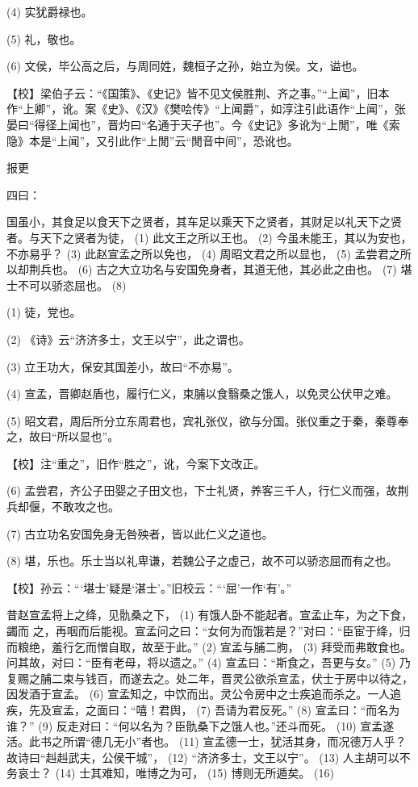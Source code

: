 \documentclass[12pt,UTF8]{ctexbook}
\begin{document}
(4) 实犹爵禄也。

(5) 礼，敬也。

(6) 文侯，毕公高之后，与周同姓，魏桓子之孙，始立为侯。文，谥也。

【校】梁伯子云：“《国策》、《史记》皆不见文侯胜荆、齐之事。”“上闻”，旧本作“上卿”，讹。案《史》、《汉》《樊哙传》“上闻爵”，如淳注引此语作“上闻”，张晏曰“得径上闻也”，晋灼曰“名通于天子也”。今《史记》多讹为“上閒”，唯《索隐》本是“上闻”，又引此作“上閒”云“閒音中间”，恐讹也。





报更


四曰：

国虽小，其食足以食天下之贤者，其车足以乘天下之贤者，其财足以礼天下之贤者。与天下之贤者为徒， (1) 此文王之所以王也。 (2) 今虽未能王，其以为安也，不亦易乎？ (3) 此赵宣孟之所以免也， (4) 周昭文君之所以显也， (5) 孟尝君之所以却荆兵也。 (6) 古之大立功名与安国免身者，其道无他，其必此之由也。 (7) 堪士不可以骄恣屈也。 (8)

(1) 徒，党也。

(2) 《诗》云“济济多士，文王以宁”，此之谓也。

(3) 立王功大，保安其国差小，故曰“不亦易”。

(4) 宣孟，晋卿赵盾也，履行仁义，束脯以食翳桑之饿人，以免灵公伏甲之难。

(5) 昭文君，周后所分立东周君也，宾礼张仪，欲与分国。张仪重之于秦，秦尊奉之，故曰“所以显也”。

【校】注“重之”，旧作“胜之”，讹，今案下文改正。

(6) 孟尝君，齐公子田婴之子田文也，下士礼贤，养客三千人，行仁义而强，故荆兵却偃，不敢攻之也。

(7) 古立功名安国免身无咎殃者，皆以此仁义之道也。

(8) 堪，乐也。乐士当以礼卑谦，若魏公子之虚己，故不可以骄恣屈而有之也。

【校】孙云：“‘堪士’疑是‘湛士’。”旧校云：“‘屈’一作‘有’。”

昔赵宣孟将上之绛，见骩桑之下， (1) 有饿人卧不能起者。宣孟止车，为之下食，蠲而 之，再咽而后能视。宣孟问之曰：“女何为而饿若是？”对曰：“臣宦于绛，归而粮绝，羞行乞而憎自取，故至于此。” (2) 宣孟与脯二朐， (3) 拜受而弗敢食也。问其故，对曰：“臣有老母，将以遗之。” (4) 宣孟曰：“斯食之，吾更与女。” (5) 乃复赐之脯二束与钱百，而遂去之。处二年，晋灵公欲杀宣孟，伏士于房中以待之，因发酒于宣孟。 (6) 宣孟知之，中饮而出。灵公令房中之士疾追而杀之。一人追疾，先及宣孟，之面曰：“嘻！君舆， (7) 吾请为君反死。” (8) 宣孟曰：“而名为谁？” (9) 反走对曰：“何以名为？臣骩桑下之饿人也。”还斗而死。 (10) 宣孟遂活。此书之所谓“德几无小”者也。 (11) 宣孟德一士，犹活其身，而况德万人乎？故诗曰“赳赳武夫，公侯干城”， (12) “济济多士，文王以宁”。 (13) 人主胡可以不务哀士？ (14) 士其难知，唯博之为可， (15) 博则无所遁矣。 (16)
\end{document}
